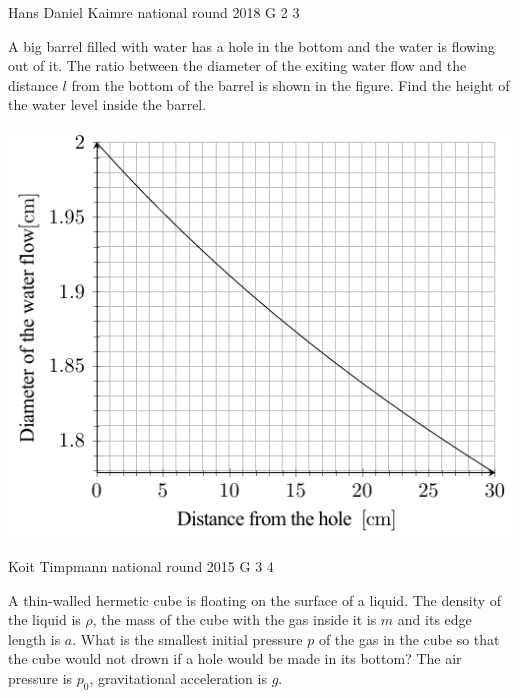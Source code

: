 \documentclass[11pt]{article}
\begin{document}
{Hans Daniel Kaimre} %
{national round} %
{2018} %
{G 2} %
{3} %
{

\ifEngStatement
A big barrel filled with water has a hole in the bottom and the water is flowing out of it. The ratio between the diameter of the exiting water flow and the distance $l$ from the bottom of the barrel is shown in the figure. Find the height of the water level inside the barrel.
\begin{center}
\includegraphics[width = 0.6\linewidth]{2018-v3g-02-juga_ing}
\end{center}
\fi
}

{Koit Timpmann} %
{national round} %
{2015} %
{G 3} %
{4} %
{

\ifEngStatement
A thin-walled hermetic cube is floating on the surface of a liquid. The density of the liquid is $\rho$, the mass of the cube with the gas inside it is $m$ and its edge length is $a$. What is the smallest initial pressure $p$ of the gas in the cube so that the cube would not drown if a hole would be made in its bottom? The air pressure is $p_0$, gravitational acceleration is $g$.
\fi
}
\end{document}
